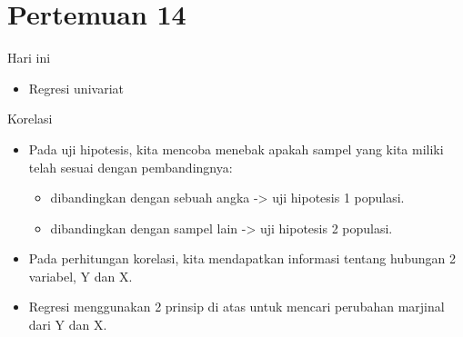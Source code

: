 \documentclass[
  ignorenonframetext,
]{beamer}
\providecommand{\tightlist}{%
  \setlength{\itemsep}{0pt}\setlength{\parskip}{0pt}}\usepackage{longtable,booktabs,array}
\begin{document}
\section{Pertemuan 14}\label{pertemuan-14}

\begin{frame}{Hari ini}
\label{hari-ini-4}
\begin{itemize}
\tightlist
\item
  Regresi univariat
\end{itemize}
\end{frame}

\begin{frame}{Korelasi}
\label{korelasi-2}
\begin{itemize}
\item
  Pada uji hipotesis, kita mencoba menebak apakah sampel yang kita
  miliki telah sesuai dengan pembandingnya:

  \begin{itemize}
  \item
    dibandingkan dengan sebuah angka -\textgreater{} uji hipotesis 1
    populasi.
  \item
    dibandingkan dengan sampel lain -\textgreater{} uji hipotesis 2
    populasi.
  \end{itemize}
\item
  Pada perhitungan korelasi, kita mendapatkan informasi tentang hubungan
  2 variabel, Y dan X.
\item
  Regresi menggunakan 2 prinsip di atas untuk mencari perubahan marjinal
  dari Y dan X.
\end{itemize}
\end{frame}
\end{document}
